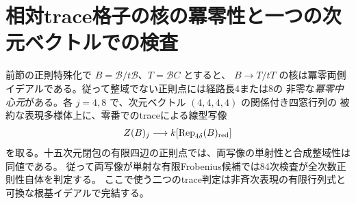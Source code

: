 \section{相対trace格子の核の冪零性と一つの次元ベクトルでの検査}
\label{sec:relative-trace-nilpotence}
\begin{theorem}\label{thm:relative-trace-nilpotence}
前節の正則特殊化で $B=\mathcal B/t\mathcal B$、$T=\mathcal B C$ とすると、
$B\to T/tT$ の核は冪零両側イデアルである。従って整域でない正則点には経路長4または8の
非零な\emph{冪零中心元}がある。各 $j=4,8$ で、次元ベクトル $(4,4,4,4)$ の関係付き四窓行列の
被約な表現多様体上に、零番でのtraceによる線型写像
\[
         Z(B)_j\longrightarrow k[\operatorname{Rep}_{4\delta}(B)_{\rm red}]
\]
を取る。十五次元閉包の有限四辺の正則点では、両写像の単射性と合成整域性は同値である。
従って両写像が単射な有限Frobenius候補では84次検査が全次数正則性自体を判定する。
ここで使う二つのtrace判定は非斉次表現の有限行列式と可換な根基イデアルで完結する。
\end{theorem}
